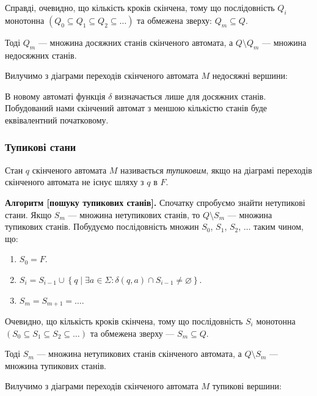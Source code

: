 Справді, очевидно, що кількість кроків скінчена, тому що послідовність $Q_i$ монотонна $\left(Q_0 \subseteq Q_1 \subseteq Q_2 \subseteq \ldots\right)$ та обмежена зверху: $Q_m \subseteq Q$. \medskip

Тоді $Q_m$ --- множина досяжних станів скінченого автомата, а $Q\setminus Q_m$ --- множина недосяжних станів. \medskip

Вилучимо з діаграми переходів скінченого автомата $M$ недосяжні вершини:
\begin{figure}[H]
	\centering
	
\end{figure}

В новому автоматі функція $\delta$ визначається лише для досяжних станів. Побудований нами скінчений автомат з меншою кількістю станів буде еквівалентний початковому.

\subsubsection{Тупикові стани}

Стан $q$ скінченого автомата $M$ називається \textit{тупиковим}, якщо на діаграмі переходів скінченого автомата не існує шляху з $q$ в $F$. \medskip

\textbf{Алгоритм [пошуку тупикових станів].} Спочатку спробуємо знайти нетупикові стани. Якщо $S_m$ --- множина нетупикових станів, то $Q \setminus S_m$ --- множина тупикових станів. Побудуємо послідовність множин $S_0$, $S_1$, $S_2$, $\ldots$ таким чином, що:
\begin{enumerate}
	\item $S_0 = F$.
	\item $S_i = S_{i - 1} \cup \left\{ q \mid \exists a \in \Sigma: \delta(q, a) \cap S_{i - 1} \ne \varnothing \right\}$.
	\item $S_m = S_{m + 1} = \ldots$.
\end{enumerate}

Очевидно, що кількість кроків скінчена, тому що послідовність $S_i$ монотонна $\left(S_0 \subseteq S_1 \subseteq S_2 \subseteq \ldots\right)$ та обмежена зверху --- $S_m \subseteq Q$. \medskip

Тоді $S_m$ --- множина нетупикових станів скінченого автомата, а $Q \setminus S_m$ --- множина тупикових станів.  \medskip

Вилучимо з діаграми переходів скінченого автомата $M$ тупикові вершини:
\begin{figure}[H]
	\centering
	
\end{figure}

